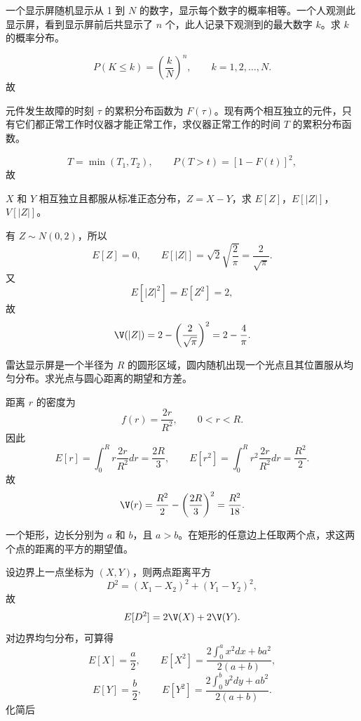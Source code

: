 \begin{question}
一个显示屏随机显示从 1 到 $N$ 的数字，显示每个数字的概率相等。一个人观测此显示屏，看到显示屏前后共显示了 $n$ 个，此人记录下观测到的最大数字 $k$。求 $k$ 的概率分布。
\begin{solution}
\[
P(K\le k)=\left(\frac{k}{N}\right)^n,\qquad k=1,2,\dots,N.
\]
故
\end{solution}
\end{question}

\begin{question}
元件发生故障的时刻 $\tau$ 的累积分布函数为 $F(\tau)$。现有两个相互独立的元件，只有它们都正常工作时仪器才能正常工作，求仪器正常工作的时间 $T$ 的累积分布函数。
\begin{solution}
\[
T=\min(T_1,T_2),\qquad
P(T>t)=[1-F(t)]^2,
\]
故

\end{solution}
\end{question}

\begin{question}
$X$ 和 $Y$ 相互独立且都服从标准正态分布，$Z=X-Y$，求 $E[Z]$，$E[|Z|]$，$V[|Z|]$。
\begin{solution}
有 $Z\sim N(0,2)$，所以
\[
E[Z]=0,
\qquad E[|Z|]=\sqrt2\sqrt{\frac{2}{\pi}}=\frac{2}{\sqrt\pi}.
\]
又
\[
E[|Z|^2]=E[Z^2]=2,
\]
故
\[
\V(|Z|)=2-\left(\frac{2}{\sqrt\pi}\right)^2=2-\frac{4}{\pi}.
\]
\end{solution}
\end{question}

\begin{question}[10 分]
雷达显示屏是一个半径为 $R$ 的圆形区域，圆内随机出现一个光点且其位置服从均匀分布。求光点与圆心距离的期望和方差。
\begin{solution}
距离 $r$ 的密度为
\[
f(r)=\frac{2r}{R^2},\qquad 0<r<R.
\]
因此
\[
E[r]=\int_0^R r\frac{2r}{R^2}dr=\frac{2R}{3},
\qquad
E[r^2]=\int_0^R r^2\frac{2r}{R^2}dr=\frac{R^2}{2}.
\]
故
\[
\V(r)=\frac{R^2}{2}-\left(\frac{2R}{3}\right)^2=\frac{R^2}{18}.
\]
\end{solution}
\end{question}

\begin{question}[10 分]
一个矩形，边长分别为 $a$ 和 $b$，且 $a>b$。在矩形的任意边上任取两个点，求这两个点的距离的平方的期望值。
\begin{solution}
设边界上一点坐标为 $(X,Y)$，则两点距离平方
\[
D^2=(X_1-X_2)^2+(Y_1-Y_2)^2,
\]
故
\[
E[D^2]=2\V(X)+2\V(Y).
\]
对边界均匀分布，可算得
\[
E[X]=\frac a2,
\qquad
E[X^2]=\frac{2\int_0^a x^2dx+ba^2}{2(a+b)},
\]
\[
E[Y]=\frac b2,
\qquad
E[Y^2]=\frac{2\int_0^b y^2dy+ab^2}{2(a+b)}.
\]
化简后
\end{solution}
\end{question}

